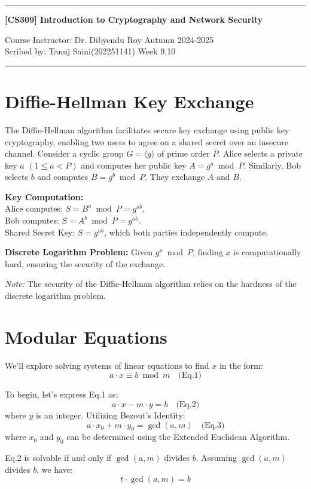 \documentclass[11pt]{article}
\begin{document}
\noindent
\rule{\textwidth}{1pt}
\begin{center}
{\bf [CS309] Introduction to Cryptography and Network Security}
\end{center}
Course Instructor: Dr. Dibyendu Roy \hfill Autumn 2024-2025\\
Scribed by: Tanuj Saini(202251141) \hfill  Week 9,10
\\
\rule{\textwidth}{1pt}

\section{Diffie-Hellman Key Exchange}
The Diffie-Hellman algorithm facilitates secure key exchange using public key cryptography, enabling two users to agree on a shared secret over an insecure channel. Consider a cyclic group $G = \langle g\rangle$ of prime order $P$. Alice selects a private key $a$ $(1 \leq a < P)$ and computes her public key $A = g^a \bmod P$. Similarly, Bob selects $b$ and computes $B = g^b \bmod P$. They exchange $A$ and $B$.

\textbf{Key Computation:}\\
Alice computes: $S = B^a \bmod P = g^{ab}$,\\
Bob computes: $S = A^b \bmod P = g^{ab}$.\\
Shared Secret Key: $S = g^{ab}$, which both parties independently compute.

\textbf{Discrete Logarithm Problem:} Given $g^x \bmod P$, finding $x$ is computationally hard, ensuring the security of the exchange.

\textit{Note:} The security of the Diffie-Hellman algorithm relies on the hardness of the discrete logarithm problem.

\section{Modular Equations}
We'll explore solving systems of linear equations to find $x$ in the form:
\[ a \cdot x \equiv b \bmod m \quad \text{(Eq.1)} \]

To begin, let's express Eq.1 as:
\[ a \cdot x - m \cdot y = b \quad \text{(Eq.2)} \]
where $y$ is an integer. Utilizing Bezout's Identity:
\[ a \cdot x_0 + m \cdot y_0 = \gcd(a, m) \quad \text{(Eq.3)} \]
where $x_0$ and $y_0$ can be determined using the Extended Euclidean Algorithm.

Eq.2 is solvable if and only if $\gcd(a, m)$ divides $b$. Assuming $\gcd(a, m)$ divides $b$, we have:
\[ t \cdot \gcd(a, m) = b \]
\end{document}
